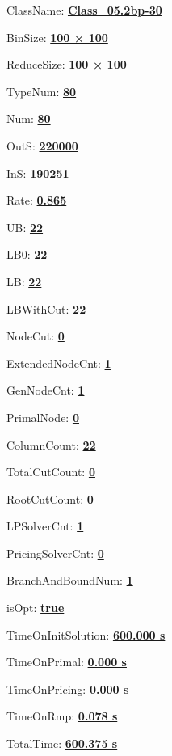 \documentclass[11pt]{article}
\begin{document}
\pagestyle{empty}


ClassName: \underline{\textbf{Class_05.2bp-30}}
\par
BinSize: \underline{\textbf{100 × 100}}
\par
ReduceSize: \underline{\textbf{100 × 100}}
\par
TypeNum: \underline{\textbf{80}}
\par
Num: \underline{\textbf{80}}
\par
OutS: \underline{\textbf{220000}}
\par
InS: \underline{\textbf{190251}}
\par
Rate: \underline{\textbf{0.865}}
\par
UB: \underline{\textbf{22}}
\par
LB0: \underline{\textbf{22}}
\par
LB: \underline{\textbf{22}}
\par
LBWithCut: \underline{\textbf{22}}
\par
NodeCut: \underline{\textbf{0}}
\par
ExtendedNodeCnt: \underline{\textbf{1}}
\par
GenNodeCnt: \underline{\textbf{1}}
\par
PrimalNode: \underline{\textbf{0}}
\par
ColumnCount: \underline{\textbf{22}}
\par
TotalCutCount: \underline{\textbf{0}}
\par
RootCutCount: \underline{\textbf{0}}
\par
LPSolverCnt: \underline{\textbf{1}}
\par
PricingSolverCnt: \underline{\textbf{0}}
\par
BranchAndBoundNum: \underline{\textbf{1}}
\par
isOpt: \underline{\textbf{true}}
\par
TimeOnInitSolution: \underline{\textbf{600.000 s}}
\par
TimeOnPrimal: \underline{\textbf{0.000 s}}
\par
TimeOnPricing: \underline{\textbf{0.000 s}}
\par
TimeOnRmp: \underline{\textbf{0.078 s}}
\par
TotalTime: \underline{\textbf{600.375 s}}
\par
\newpage


\end{document}
